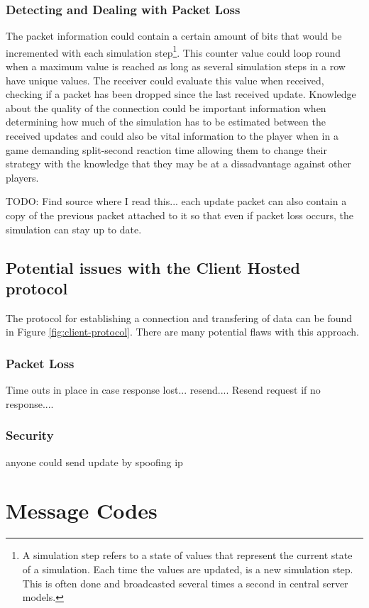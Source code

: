 \newpage


\subsubsection{Detecting and Dealing with Packet Loss}
The packet information could contain a certain amount of bits that would be incremented with each simulation step\footnote{A simulation step refers to a state of values that represent the current state of a simulation. Each time the values are updated, is a new simulation step. This is often done and broadcasted several times a second in central server models.}. This counter value could loop round when a maximum value is reached as long as several simulation steps in a row have unique values. The receiver could evaluate this value when received, checking if a packet has been dropped since the last received update. Knowledge about the quality of the connection could be important information when determining how much of the simulation has to be estimated between the received updates and could also be vital information to the player when in a game demanding split-second reaction time allowing them to change their strategy with the knowledge that they may be at a dissadvantage against other players.

TODO: Find source where I read this...
each update packet can also contain a copy of the previous packet attached to it so that even if packet loss occurs, the simulation can stay up to date.





\newpage



\subsection{Potential issues with the Client Hosted protocol}
The protocol for establishing a connection and transfering of data can be found in Figure \ref{fig:client-protocol}. There are many potential flaws with this approach.
\subsubsection{Packet Loss}
Time outs in place in case response lost...
resend....
Resend request if no response....


\subsubsection{Security}
anyone could send update by spoofing ip


\pagebreak
\section{Message Codes}



\pagebreak
